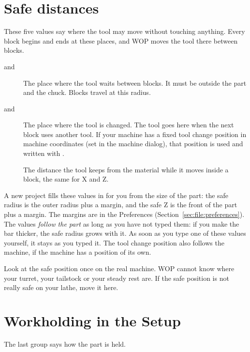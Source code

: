 \section{Safe distances}\label{sec:project:safe}

These five values say where the tool may move without touching anything. Every block begins and ends at these places, and WOP moves the tool there between blocks.

\begin{description}
\item[ and ] The place where the tool waits between blocks. It must be outside the part and the chuck. Blocks travel at this radius.
\item[ and ] The place where the tool is changed. The tool goes here when the next block uses another tool. If your machine has a fixed tool change position in machine coordinates (set in the machine dialog), that position is used and written with .
\item[] The distance the tool keeps from the material while it moves inside a block, the same for X and Z.
\end{description}

A new project fills these values in for you from the size of the part: the safe radius is the outer radius plus a margin, and the safe Z is the front of the part plus a margin. The margins are in the Preferences (Section~\ref{sec:file:preferences}). The values \emph{follow the part} as long as you have not typed them: if you make the bar thicker, the safe radius grows with it. As soon as you type one of these values yourself, it stays as you typed it. The tool change position also follows the machine, if the machine has a position of its own.

\begin{warningbox}
Look at the safe position once on the real machine. WOP cannot know where your turret, your tailstock or your steady rest are. If the safe position is not really safe on your lathe, move it here.
\end{warningbox}

\section{Workholding in the Setup}\label{sec:project:holding}

The last group says how the part is held.

